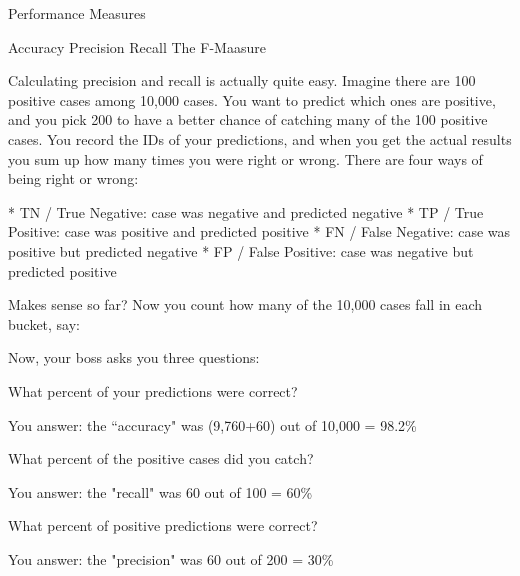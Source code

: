 Performance Measures

Accuracy
Precision
Recall
The F-Maasure






Calculating precision and recall is actually quite easy. Imagine there are 100 positive cases among 10,000 cases. You want to predict which ones are positive, and you pick 200 to have a better chance of catching many of the 100 positive cases.  You record the IDs of your predictions, and when you get the actual results you sum up how many times you were right or wrong. There are four ways of being right or wrong:


* TN / True Negative: case was negative and predicted negative
* TP / True Positive: case was positive and predicted positive
* FN / False Negative: case was positive but predicted negative
* FP / False Positive: case was negative but predicted positive


Makes sense so far? Now you count how many of the 10,000 cases fall in each bucket, say:



Now, your boss asks you three questions:

What percent of your predictions were correct? 

You answer: the ``accuracy" was (9,760+60) out of 10,000 = 98.2\%

What percent of the positive cases did you catch? 

You answer: the "recall" was 60 out of 100 = 60\%

What percent of positive predictions were correct? 

You answer: the "precision" was 60 out of 200 = 30\%


\newpage
